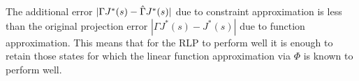 \begin{comment}
An interesting feature is that unlike prior work on constraint sampling based on concentration inequalities (e.g.,  \cite{CS}), our analysis is based on contraction operators and is completely deterministic.
In particular, the error term $\etmn$ gives new insights into constraint selection:
The result of Theorem~\ref{st} is that
\end{comment}
The additional error $|\Gamma J^*(s) -\hat{\Gamma} J^*(s)|$ due to constraint approximation is less than the original projection error $|\Gamma J^*(s)-J^*(s)|$ due to function approximation. This means that for the RLP to perform well it is enough to retain those states for which the linear function approximation via $\Phi$ is known to perform well.
